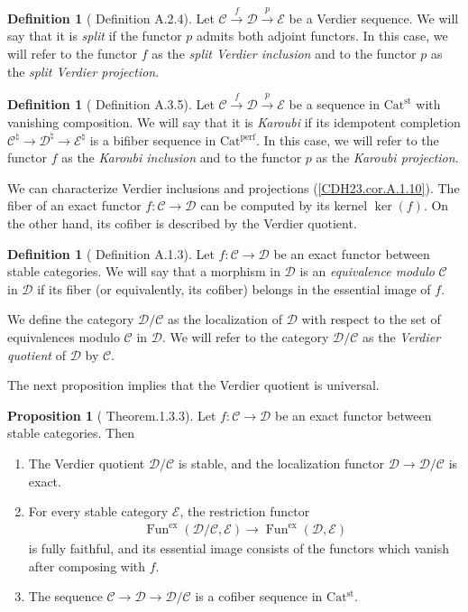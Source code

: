 \documentclass[a4paper,dvipdfmx,11pt,reqno]{amsart}
\DeclareMathOperator{\Fun}{Fun}
\newcommand{\C}{\mathcal{C}}
\newcommand{\D}{\mathcal{D}}
\newcommand{\E}{\mathcal{E}}
\newcommand{\Catperf}{\mathrm{Cat^{perf}}}
\newcommand{\Catst}{\mathrm{Cat^{st}}}
\theoremstyle{definition}
\newtheorem{definition}[theorem]{Definition}
\newtheorem{proposition}[theorem]{Proposition}
\begin{document}
\begin{definition}[\cite{CDH23} Definition A.2.4] \label{CDH23.def.A.2.4}
  Let $\C \xrightarrow{f} \D \xrightarrow{p} \E$ be a Verdier sequence.
  We will say that it is \textit{split} if the functor $p$ admits both adjoint functors.
  In this case, we will refer to the functor $f$ as the \textit{split Verdier inclusion} and to the functor $p$ as the \textit{split Verdier projection}.
\end{definition}

\begin{definition}[\cite{CDH23} Definition A.3.5] \label{CDH23.def.A.3.5}
  Let $\C \xrightarrow{f} \D \xrightarrow{p} \E$ be a sequence in $\Catst$ with vanishing composition.
  We will say that it is \textit{Karoubi} if its idempotent completion $\C^{\natural} \to \D^{\natural} \to \E^{\natural}$ is a bifiber sequence in $\Catperf$.
  In this case, we will refer to the functor $f$ as the \textit{Karoubi inclusion} and to the functor $p$ as the \textit{Karoubi projection}.
\end{definition}

We can characterize Verdier inclusions and projections (\cref{CDH23.cor.A.1.10}).
The fiber of an exact functor $f : \C \to \D$ can be computed by its kernel $\ker(f)$.
On the other hand, its cofiber is described by the Verdier quotient.

\begin{definition}[\cite{CDH23} Definition A.1.3] \label{CDH23.def.A.1.3}
  Let $f : \C \to \D$ be an exact functor between stable categories.
  We will say that a morphism in $\D$ is an \textit{equivalence modulo} $\C$ in $\D$ if its fiber (or equivalently, its cofiber) belongs in the essential image of $f$.

  We define the category $\D/\C$ as the localization of $\D$ with respect to the set of equivalences modulo $\C$ in $\D$.
  We will refer to the category $\D/\C$ as the \textit{Verdier quotient} of $\D$ by $\C$.
\end{definition}

The next proposition implies that the Verdier quotient is universal.

\begin{proposition}[\cite{NS18} Theorem.1.3.3] \label{NS18.thrm.1.3.3}
  Let $f : \C \to \D$ be an exact functor between stable categories.
  Then
  \begin{enumerate}
    \item The Verdier quotient $\D/\C$ is stable, and the localization functor $\D \to \D/\C$ is exact.
    \item For every stable category $\E$, the restriction functor
    \begin{align*}
      \Fun^{\mathrm{ex}}(\D/\C,\E) \to \Fun^{\mathrm{ex}}(\D,\E)
    \end{align*}
    is fully faithful, and its essential image consists of the functors which vanish after composing with $f$.
    \item The sequence $\C \to \D \to \D/\C$ is a cofiber sequence in $\Catst$.
  \end{enumerate} 
\end{proposition}
\end{document}

